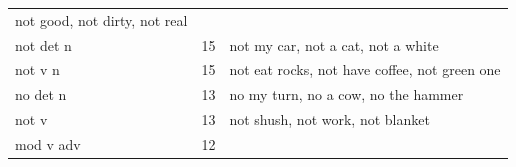 \documentclass[man,floatsintext,draftall]{apa6}
\begin{document}
\begin{longtable}[]{@{}lll@{}}
\begin{minipage}[t]{0.47\columnwidth}
not good, not dirty, not real\strut
\end{minipage}\tabularnewline
\begin{minipage}[t]{0.23\columnwidth}\raggedright\strut
not det n\strut
\end{minipage} & \begin{minipage}[t]{0.15\columnwidth}\raggedright\strut
15\strut
\end{minipage} & \begin{minipage}[t]{0.47\columnwidth}\raggedright\strut
not my car, not a cat, not a white\strut
\end{minipage}\tabularnewline
\begin{minipage}[t]{0.23\columnwidth}\raggedright\strut
not v n\strut
\end{minipage} & \begin{minipage}[t]{0.15\columnwidth}\raggedright\strut
15\strut
\end{minipage} & \begin{minipage}[t]{0.47\columnwidth}\raggedright\strut
not eat rocks, not have coffee, not green one\strut
\end{minipage}\tabularnewline
\begin{minipage}[t]{0.23\columnwidth}\raggedright\strut
no det n\strut
\end{minipage} & \begin{minipage}[t]{0.15\columnwidth}\raggedright\strut
13\strut
\end{minipage} & \begin{minipage}[t]{0.47\columnwidth}\raggedright\strut
no my turn, no a cow, no the hammer\strut
\end{minipage}\tabularnewline
\begin{minipage}[t]{0.23\columnwidth}\raggedright\strut
not v\strut
\end{minipage} & \begin{minipage}[t]{0.15\columnwidth}\raggedright\strut
13\strut
\end{minipage} & \begin{minipage}[t]{0.47\columnwidth}\raggedright\strut
not shush, not work, not blanket\strut
\end{minipage}\tabularnewline
\begin{minipage}[t]{0.23\columnwidth}\raggedright\strut
mod v adv\strut
\end{minipage} & \begin{minipage}[t]{0.15\columnwidth}\raggedright\strut
12\strut
\end{minipage} & \begin{minipage}[t]{0.47\columnwidth}\raggedright\strut

\end{minipage}
\end{longtable}
\end{document}
